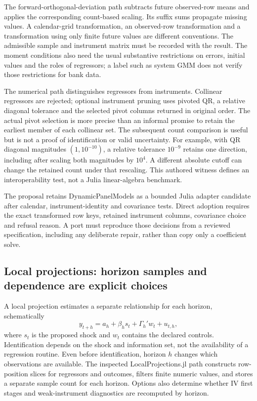 The forward-orthogonal-deviation path subtracts future observed-row means and applies the corresponding count-based scaling. Its suffix sums propagate missing values. A calendar-grid transformation, an observed-row transformation and a transformation using only finite future values are different conventions. The admissible sample and instrument matrix must be recorded with the result. The moment conditions also need the usual substantive restrictions on errors, initial values and the roles of regressors; a label such as system GMM does not verify those restrictions for bank data.

The numerical path distinguishes regressors from instruments. Collinear regressors are rejected; optional instrument pruning uses pivoted QR, a relative diagonal tolerance and the selected pivot columns returned in original order. The actual pivot selection is more precise than an informal promise to retain the earliest member of each collinear set. The subsequent count comparison is useful but is not a proof of identification or valid uncertainty. For example, with QR diagonal magnitudes $(1,10^{-10})$, a relative tolerance $10^{-9}$ retains one direction, including after scaling both magnitudes by $10^4$. A different absolute cutoff can change the retained count under that rescaling. This authored witness defines an interoperability test, not a Julia linear-algebra benchmark.~\citep{exec25_odyn_dpm,exec25_odyn_choice}

The proposal retains DynamicPanelModels as a bounded Julia adapter candidate after calendar, instrument-identity and covariance tests. Direct adoption requires the exact transformed row keys, retained instrument columns, covariance choice and refusal reason. A port must reproduce those decisions from a reviewed specification, including any deliberate repair, rather than copy only a coefficient solve.

\subsection{Local projections: horizon samples and dependence are explicit choices}

A local projection estimates a separate relationship for each horizon, schematically
\[
 y_{t+h}=a_h+\beta_h s_t+\Gamma_h'w_t+u_{t,h},
\]
where $s_t$ is the proposed shock and $w_t$ contains the declared controls. Identification depends on the shock and information set, not the availability of a regression routine. Even before identification, horizon $h$ changes which observations are available. The inspected LocalProjections.jl path constructs row-position slices for regressors and outcomes, filters finite numeric values, and stores a separate sample count for each horizon. Options also determine whether IV first stages and weak-instrument diagnostics are recomputed by horizon.~\citep{exec25_odyn_lp}

